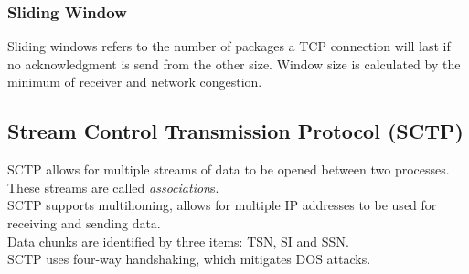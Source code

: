 \documentclass[11pt,a4paper,twoside]{book}
\begin{document}
\subsubsection{Sliding Window}

Sliding windows refers to the number of packages a TCP connection will last if no acknowledgment is send from the other size. Window size is calculated by the minimum of receiver and network congestion.

\subsection{Stream Control Transmission Protocol (SCTP)}

SCTP allows for multiple streams of data to be opened between two processes. These streams are called \textit{association}s.\\

SCTP supports multihoming, allows for multiple IP addresses to be used for receiving and sending data.\\

Data chunks are identified by three items: TSN, SI and SSN.\\

SCTP uses four-way handshaking, which mitigates DOS attacks.
\end{document}
